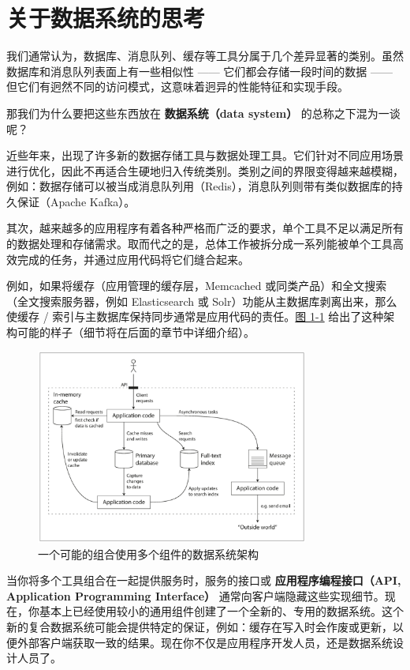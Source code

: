 \section{关于数据系统的思考}
我们通常认为，数据库、消息队列、缓存等工具分属于几个差异显著的类别。虽然数据库和消息队列表面上有一些相似性 —— 它们都会存储一段时间的数据 —— 但它们有迥然不同的访问模式，这意味着迥异的性能特征和实现手段。

那我们为什么要把这些东西放在 \textbf{数据系统（data system）} 的总称之下混为一谈呢？

近些年来，出现了许多新的数据存储工具与数据处理工具。它们针对不同应用场景进行优化，因此不再适合生硬地归入传统类别\cite{stonebraker2005}。类别之间的界限变得越来越模糊，例如：数据存储可以被当成消息队列用（Redis），消息队列则带有类似数据库的持久保证（Apache Kafka）。

其次，越来越多的应用程序有着各种严格而广泛的要求，单个工具不足以满足所有的数据处理和存储需求。取而代之的是，总体工作被拆分成一系列能被单个工具高效完成的任务，并通过应用代码将它们缝合起来。

例如，如果将缓存（应用管理的缓存层，Memcached 或同类产品）和全文搜索（全文搜索服务器，例如 Elasticsearch 或 Solr）功能从主数据库剥离出来，那么使缓存 / 索引与主数据库保持同步通常是应用代码的责任。\href{img/fig1-1.png}{图 1-1} 给出了这种架构可能的样子（细节将在后面的章节中详细介绍）。

\begin{figure}[h]
  \centering
  \includegraphics[width=0.8\textwidth]{img/fig1-1.png}
  \caption{一个可能的组合使用多个组件的数据系统架构}
\end{figure}

当你将多个工具组合在一起提供服务时，服务的接口或 \textbf{应用程序编程接口（API, Application Programming Interface）} 通常向客户端隐藏这些实现细节。现在，你基本上已经使用较小的通用组件创建了一个全新的、专用的数据系统。这个新的复合数据系统可能会提供特定的保证，例如：缓存在写入时会作废或更新，以便外部客户端获取一致的结果。现在你不仅是应用程序开发人员，还是数据系统设计人员了。

